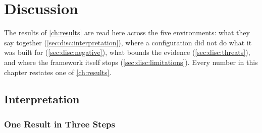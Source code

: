 
\chapter{Discussion}\label{ch:discussion}

The results of \autoref{ch:results} are read here across the five environments: what they say
together (\autoref{sec:disc:interpretation}), where a configuration did not do what it was built for
(\autoref{sec:disc:negative}), what bounds the evidence (\autoref{sec:disc:threats}), and where the
framework itself stops (\autoref{sec:disc:limitations}). Every number in this chapter restates one of
\autoref{ch:results}.

\section{Interpretation}\label{sec:disc:interpretation}

\subsection{One Result in Three Steps}\label{sec:disc:threesteps}

